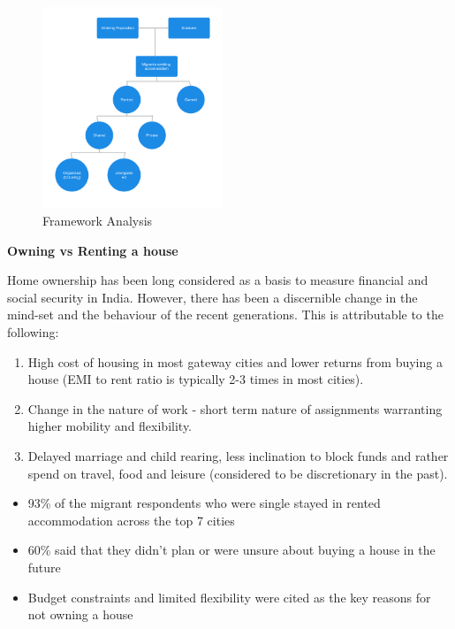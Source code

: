 \clearpage
\begin{figure}
      \centering
      \includegraphics[width=0.48\textwidth]{Images/framework.png}
      \caption{Framework Analysis}
\end{figure}

\noindent\textbf{Owning vs Renting a house}\par\medskip
\noindent Home ownership has been long considered as a basis to measure financial and social security in India.
However, there has been a discernible change in the mind-set and the behaviour of the recent generations. This is attributable to the following:\par

\begin{enumerate}
      \item High cost of housing in most gateway cities and lower returns from buying a house (EMI to rent ratio is typically 2-3 times in
            most cities).
      \item Change in the nature of work - short term nature of assignments warranting higher mobility and flexibility.
      \item Delayed marriage and child rearing, less inclination to block funds and rather spend on travel, food and leisure (considered to
            be discretionary in the past).
\end{enumerate}

\begin{itemize}
      \item 93\% of the migrant respondents who were single stayed in rented accommodation across the top 7 cities
      \item 60\% said that they didn’t plan or were unsure about buying a house in the future
      \item Budget constraints and limited flexibility were cited as the key reasons for not owning a house
\end{itemize}


